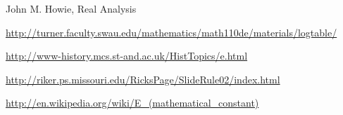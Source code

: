 \documentclass[12pt]{article}
\theoremstyle{mystyle}
\begin{document}
\begin{thebibliography}{10}

John M. Howie, Real Analysis

\url{http://turner.faculty.swau.edu/mathematics/math110de/materials/logtable/}

\url{http://www-history.mcs.st-and.ac.uk/HistTopics/e.html}

\url{http://riker.ps.missouri.edu/RicksPage/SlideRule02/index.html}

\url{http://en.wikipedia.org/wiki/E_(mathematical_constant)}

\end{thebibliography}
\end{document}
